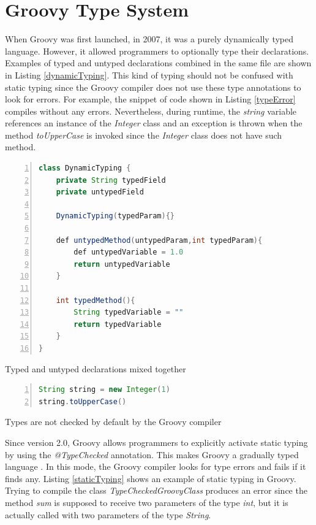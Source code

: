 \documentclass[msc]{ppgccufmg}
\begin{document}
\section{Groovy Type System}

When Groovy was first launched, in 2007, it was a purely dynamically typed language.
However, it allowed programmers to optionally type their declarations.
Examples of typed and untyped declarations combined in the same file are shown in Listing \ref{dynamicTyping}.
This kind of typing should not be confused with static typing since the Groovy compiler does not use these type annotations to look for errors.
For example, the snippet of code shown in Listing \ref{typeError} compiles without any errors.
Nevertheless, during runtime, the \emph{string} variable references an instance of the \emph{Integer} class and an exception is thrown when the method \emph{toUpperCase} is invoked since the \emph{Integer} class does not have such method.

\begin{Listing}[ht]
\begin{lstlisting}[basicstyle=\ttfamily, language=Java,tabsize=2,breaklines=true,numbers=left,morekeywords={def}]
class DynamicTyping {
	private String typedField
	private untypedField

	DynamicTyping(typedParam){}

	def untypedMethod(untypedParam,int typedParam){
		def untypedVariable = 1.0
		return untypedVariable
	}

	int typedMethod(){
		String typedVariable = ""
		return typedVariable
	}
}
\end{lstlisting}
\caption{Typed and untyped declarations mixed together}
\label{dynamicTyping}
\end{Listing}

\begin{Listing}[ht]
\begin{lstlisting}[basicstyle=\ttfamily, language=Java,tabsize=2,breaklines=true,numbers=left]
String string = new Integer(1)
string.toUpperCase()
\end{lstlisting}
\caption{Types are not checked by default by the Groovy compiler}
\label{typeError}
\end{Listing}

Since version 2.0, Groovy allows programmers to explicitly activate static typing by using the \emph{@TypeChecked} annotation.
This makes Groovy a gradually typed language \cite{gray05,gray08,gray11,siek07,takikawa12}.
In this mode, the Groovy compiler looks for type errors and fails if it finds any.
Listing \ref{staticTyping} shows an example of static typing in Groovy.
Trying to compile the class \emph{TypeCheckedGroovyClass} produces an error since the method \emph{sum} is supposed to receive two parameters of the type \emph{int}, but it is actually called with two parameters of the type \emph{String}.
\end{document}
